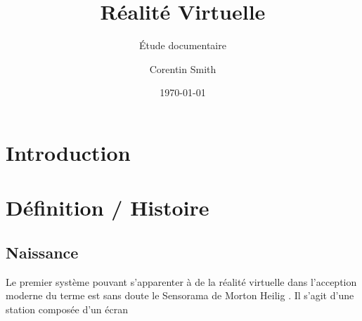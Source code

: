 \documentclass[a4]{scrartcl}
\title{Réalité Virtuelle}
\subtitle{Étude documentaire}
\author{Corentin Smith}
\date{\today}
\begin{document}
\maketitle

\newpage
\tableofcontents

\newpage
\section{Introduction}

\section{Définition / Histoire}

\subsection{Naissance}

Le premier système pouvant s'apparenter à de la réalité virtuelle dans l'acception moderne du terme est sans doute le Sensorama de Morton Heilig \cite{Sensorama}. Il s'agit d'une station composée d'un écran
\end{document}
